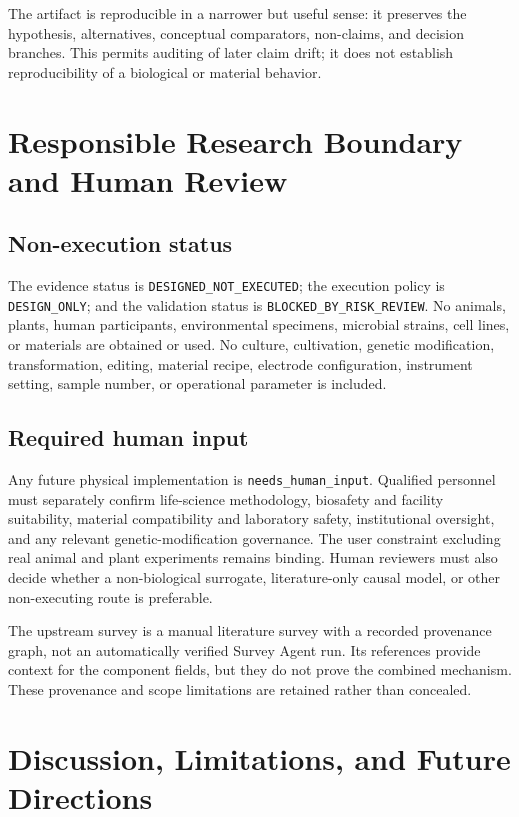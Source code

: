 \documentclass[conference]{IEEEtran}
\begin{document}
The artifact is reproducible in a narrower but useful sense: it preserves the hypothesis, alternatives, conceptual comparators, non-claims, and decision branches. This permits auditing of later claim drift; it does not establish reproducibility of a biological or material behavior.

\section{Responsible Research Boundary and Human Review}

\subsection{Non-execution status}

The evidence status is \texttt{DESIGNED\_NOT\_EXECUTED}; the execution policy is \texttt{DESIGN\_ONLY}; and the validation status is \texttt{BLOCKED\_BY\_RISK\_REVIEW}. No animals, plants, human participants, environmental specimens, microbial strains, cell lines, or materials are obtained or used. No culture, cultivation, genetic modification, transformation, editing, material recipe, electrode configuration, instrument setting, sample number, or operational parameter is included.

\subsection{Required human input}

Any future physical implementation is \texttt{needs\_human\_input}. Qualified personnel must separately confirm life-science methodology, biosafety and facility suitability, material compatibility and laboratory safety, institutional oversight, and any relevant genetic-modification governance. The user constraint excluding real animal and plant experiments remains binding. Human reviewers must also decide whether a non-biological surrogate, literature-only causal model, or other non-executing route is preferable.

The upstream survey is a manual literature survey with a recorded provenance graph, not an automatically verified Survey Agent run. Its references provide context for the component fields, but they do not prove the combined mechanism. These provenance and scope limitations are retained rather than concealed.

\section{Discussion, Limitations, and Future Directions}
\end{document}

